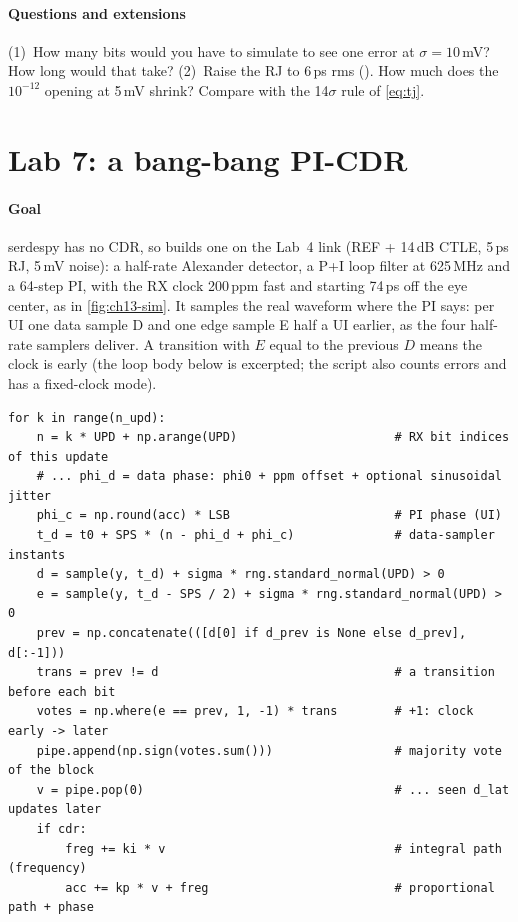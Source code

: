 \paragraph{Questions and extensions} (1)~How many bits would you have to simulate to see one error at $\sigma=10$\,mV? How long would that take? (2)~Raise the RJ to 6\,ps rms (). How much does the $10^{-12}$ opening at 5\,mV shrink? Compare with the 14$\sigma$ rule of \cref{eq:tj}.

\section{Lab 7: a bang-bang PI-CDR}\label{sec:lab7}

\paragraph{Goal} serdespy has no CDR, so  builds one on the Lab~4 link (REF + 14\,dB CTLE, 5\,ps RJ, 5\,mV noise): a half-rate Alexander detector, a P+I loop filter at 625\,MHz and a 64-step PI, with the RX clock 200\,ppm fast and starting 74\,ps off the eye center, as in \cref{fig:ch13-sim}. It samples the real waveform where the PI says: per UI one data sample D and one edge sample E half a UI earlier, as the four half-rate samplers deliver. A transition with $E$ equal to the previous $D$ means the clock is early (the loop body below is excerpted; the script also counts errors and has a fixed-clock mode).

\begin{lstlisting}
for k in range(n_upd):
    n = k * UPD + np.arange(UPD)                      # RX bit indices of this update
    # ... phi_d = data phase: phi0 + ppm offset + optional sinusoidal jitter
    phi_c = np.round(acc) * LSB                       # PI phase (UI)
    t_d = t0 + SPS * (n - phi_d + phi_c)              # data-sampler instants
    d = sample(y, t_d) + sigma * rng.standard_normal(UPD) > 0
    e = sample(y, t_d - SPS / 2) + sigma * rng.standard_normal(UPD) > 0
    prev = np.concatenate(([d[0] if d_prev is None else d_prev], d[:-1]))
    trans = prev != d                                 # a transition before each bit
    votes = np.where(e == prev, 1, -1) * trans        # +1: clock early -> later
    pipe.append(np.sign(votes.sum()))                 # majority vote of the block
    v = pipe.pop(0)                                   # ... seen d_lat updates later
    if cdr:
        freg += ki * v                                # integral path (frequency)
        acc += kp * v + freg                          # proportional path + phase
\end{lstlisting}

